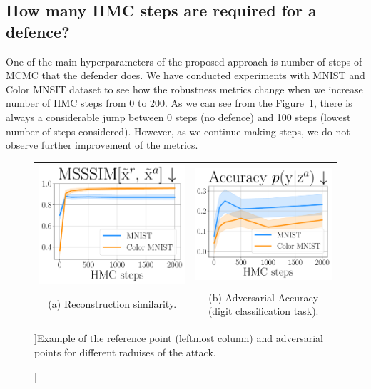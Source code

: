 \newpage

\subsection{How many HMC steps are required for a defence?}\label{appendix:hmc_steps}
One of the main hyperparameters of the proposed approach is number of steps of MCMC that the defender does. We have conducted experiments with MNIST and Color MNSIT dataset to see how the robustness metrics change when we increase number of HMC steps from 0 to 200. As we can see from the Figure~\ref{fig:hmc_step_metrics}, there is always a considerable jump between 0 steps (no defence) and 100 steps (lowest number of steps considered). However, as we continue making steps, we do not observe further improvement of the metrics. 
\begin{figure}[ht]
    \centering
    \begin{tabular}{cc}
        \includegraphics[width=0.4\columnwidth]{pics/3_adv_att/hmc_steps_ref_rec_sim.pdf} &
        \includegraphics[width=0.4\columnwidth]{pics/3_adv_att/hmc_steps_adv_acc.pdf} \\
        \multirow{2}{0.4\columnwidth}{\centering \small (a) Reconstruction similarity.} &
        \multirow{2}{0.4\columnwidth}{\centering \small (b) Adversarial Accuracy (digit classification task). } 
        \\
        \\
    \end{tabular}
    \caption[][\baselineskip]{Example of the reference point (leftmost column) and adversarial points for different raduises of the attack.}
    \label{fig:hmc_step_metrics}
\end{figure}
\newpage

